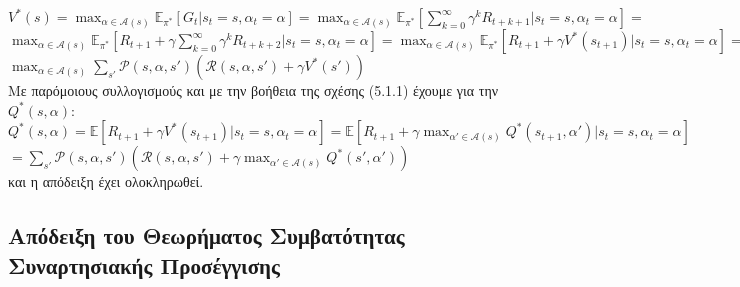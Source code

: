 \documentclass[11pt]{article} %
\numberwithin{equation}{subsection}
\begin{document}
$\displaystyle V^{*}(s) = \max_{\alpha \in \mathcal{A}(s)} \mathbb{E}_{\pi^{*}}\left[G_{t} | s_{t} =s, \alpha_{t} = \alpha \right] = \displaystyle  \max_{\alpha \in \mathcal{A}(s)} \mathbb{E}_{\pi^{*}}\left[ \sum_{k=0}^{\infty} \gamma^{k} R_{t+k+1} | s_{t} =s, \alpha_{t} = \alpha \right] =$ \\
$\displaystyle \max_{\alpha \in \mathcal{A}(s)} \mathbb{E}_{\pi^{*}}\left[R_{t+1} + \gamma \sum_{k=0}^{\infty} \gamma^{k} R_{t+k+2}  | s_{t} =s, \alpha_{t} = \alpha \right] = \max_{\alpha \in \mathcal{A}(s)} \mathbb{E}_{\pi^{*}}\left[R_{t+1} + \gamma V^{*}(s_{t+1}) | s_{t} =s, \alpha_{t} = \alpha \right] =$\\
$\displaystyle \max_{\alpha \in \mathcal{A}(s)} \sum_{s'} \mathcal{P}(s, \alpha, s')\left(\mathcal{R}(s, \alpha, s') + \gamma V^{*}(s')\right)$\\

Με παρόμοιους συλλογισμούς και με την βοήθεια της σχέσης (5.1.1) έχουμε για την $Q^{*}(s, \alpha)$:\\

$\displaystyle Q^{*}(s, \alpha) = \mathbb{E} \left[R_{t+1} + \gamma V^{*}(s_{t+1}) | s_{t} = s, \alpha_{t} = \alpha \right] = \mathbb{E} \left[R_{t+1} + \gamma \max_{\alpha' \in \mathcal{A}(s)} Q^{*}(s_{t+1}, \alpha') | s_{t} = s, \alpha_{t} = \alpha \right]$\\
$\displaystyle = \sum_{s'} \mathcal{P}(s, \alpha, s') \left(\mathcal{R}(s, \alpha, s') + \gamma \max_{\alpha' \in \mathcal{A}(s)} Q^{*}(s', \alpha')\right)$\\

και η απόδειξη έχει ολοκληρωθεί.




\subsection{Απόδειξη του Θεωρήματος Συμβατότητας Συναρτησιακής Προσέγγισης}
\end{document}
